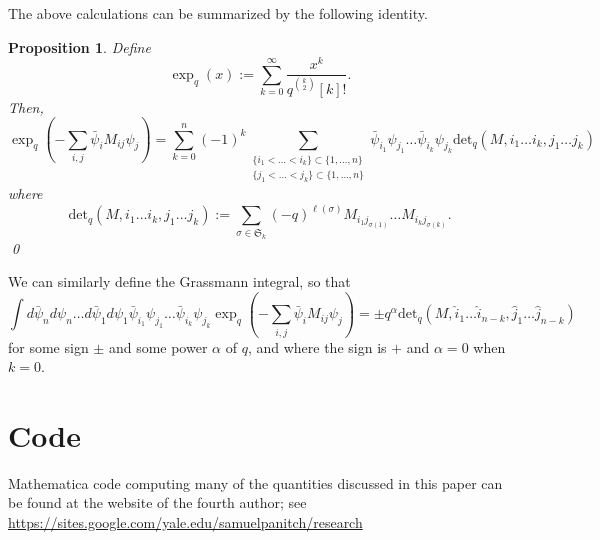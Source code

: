 \documentclass[12pt, reqno]{amsart}
\newtheorem{prop}[theo]{Proposition}
\theoremstyle{definition}
\renewcommand{\det}{\mathrm{det}}%
\renewcommand{\hat}{\widehat}
\begin{document}
The above calculations can be summarized by the following identity.

\begin{prop}
Define 
$$
\exp_{q}( x ) := \sum_{k=0}^{\infty} \frac{x^k}{q^{\binom{k}{2}} [k]!}.
$$ 
Then,
$$
\exp_q\left(-\sum_{i,j} \bar{\psi}_i  M_{i j}\psi_j\right)
=
\sum_{k=0}^{n} (-1)^k 
\sum_{\substack{\{i_1 < \dots < i_k\} \subset \{1,\dots,n\} \\ \{j_1 < \dots < j_k\} \subset \{1,\dots,n\}}} 
\bar{\psi}_{i_1} \psi_{j_1} \dots \bar{\psi}_{i_k} \psi_{j_k}
\det_q(M,i_1 \dots i_k,j_1 \dots j_k)
$$
where
$$
\det_q(M,i_1 \dots i_k,j_1 \dots j_k):=\sum_{\sigma \in \mathfrak{S}_k}
(-q)^{\ell(\sigma)}
M_{i_1 j_{\sigma(1)}} \dots M_{i_k j_{\sigma(k)}}.
$$
\qed\end{prop}

We can similarly define the Grassmann integral, so that
$$
\int d\bar{\psi}_n d\psi_n \dots d\bar{\psi}_1 d\psi_1
\bar{\psi}_{i_1} \psi_{j_1} \dots \bar{\psi}_{i_k} \psi_{j_k}
\exp_q \left(-\sum_{i,j} \bar{\psi}_i  M_{i j} \psi_j \right)
=
 \pm q^\alpha\det_q(M,{\hat{i}}_1 \dots {\hat{i}}_{n-k},{\hat{j}}_1 \dots {\hat{j}}_{n-k})
$$
for some sign $\pm$ and some power $\alpha$ of $q$, and where the sign is $+$ and $\alpha=0$ when $k=0$.  

\section{Code}\label{app:code}

Mathematica code computing many of the quantities discussed in this paper can be found at the website of the fourth author; see \url{https://sites.google.com/yale.edu/samuelpanitch/research}


\end{document}
